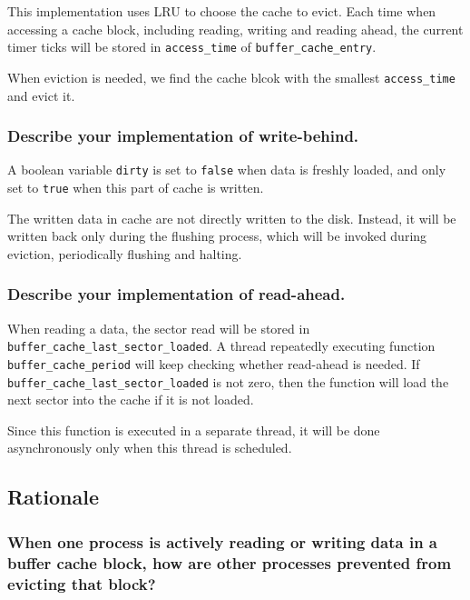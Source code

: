 \documentclass[sigconf, nonacm, balance=false, urlbreakonhyphens=true]{acmart}
\begin{document}
                This implementation uses LRU to choose the cache to evict. Each time when accessing a cache block, including reading, writing and reading ahead, the current timer ticks will be stored in \texttt{access\_time} of \texttt{buffer\_cache\_entry}. 
                
                When eviction is needed, we find the cache blcok with the smallest \texttt{access\_time} and evict it. 

            \subsubsection{Describe your implementation of write-behind. }

                A boolean variable \texttt{dirty} is set to \texttt{false} when data is freshly loaded, and only set to \texttt{true} when this part of cache is written. 

                The written data in cache are not directly written to the disk. Instead, it will be written back only during the flushing process, which will be invoked during eviction, periodically flushing and halting. 

            \subsubsection{Describe your implementation of read-ahead. }

                When reading a data, the sector read will be stored in \\ \texttt{buffer\_cache\_last\_sector\_loaded}. A thread repeatedly executing function \texttt{buffer\_cache\_period} will keep checking whether read-ahead is needed. If \texttt{buffer\_cache\_last\_sector\_loaded} is not zero, then the function will load the next sector into the cache if it is not loaded. 

                Since this function is executed in a separate thread, it will be done asynchronously only when this thread is scheduled. 
        
        \subsection{Rationale}

            \subsubsection{When one process is actively reading or writing data in a buffer cache block, how are other processes prevented from evicting that block? }
\end{document}

